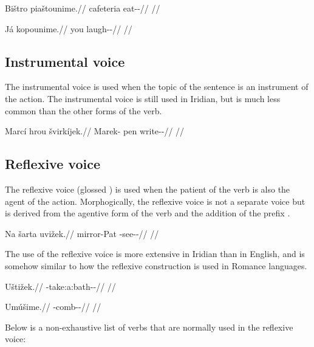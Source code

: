 \pex
\begingl
\gla Bištro piaštounime.//
\glb cafeteria eat-\Loc{}-\Prog{}//
\glft {}//
\endgl
\xe

\pex
\begingl
\gla Já kopounime.//
\glb you laugh-\Lv{}-\Prog{}//
\glft {}//
\endgl
\xe

\subsection{Instrumental voice}

The instrumental voice is used when the topic of the sentence is an instrument
of the action. The instrumental voice is still used in Iridian, but is much less
common than the other forms of the verb.

\pex
\begingl
\gla Marcí hrou švirkíjek.//
\glb Marek-\Gen{} pen write-\Iv{}-\Pf{}//
\glft {}//
\endgl
\xe


\subsection{Reflexive voice}

The reflexive voice (glossed {\Refl}) is used when the patient of the verb is
also the agent of the action. Morphogically, the reflexive voice is not a
separate voice but is derived from the agentive form of the verb and the
addition of the prefix .

\pex
\begingl
\gla Na šarta uvižek.//
\glb \Loc{} mirror-Pat{} \Refl{}-see-\Av{}-\Pf{}//
\glft {}//
\endgl
\xe

The use of the reflexive voice is more extensive in Iridian than in
English, and is somehow similar to how the reflexive construction
is used in Romance languages.

\pex
\begingl
\gla Uštižek.//
\glb \Refl{}-take:a:bath-\Av{}-\Pf{}//
\glft {}//
\endgl
\xe

\pex
\begingl
\gla Umúšime.//
\glb \Refl{}-comb-\Av{}-\Prog{}//
\glft {}//
\endgl
\xe

Below is a non-exhaustive list of verbs that are normally used in the reflexive
voice:
\bigskip

\noindent
{} \\
 \\
 \\


